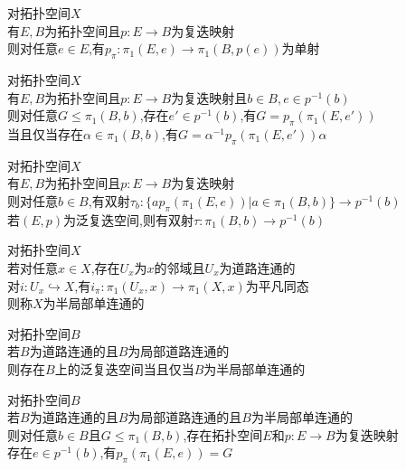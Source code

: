 \begin{dingli}
对拓扑空间$X$\\
有$E,B$为拓扑空间且$p:E\to B$为复迭映射\\
则对任意$e\in E$,有$p_{\pi}:\pi_1(E,e)\to\pi_1(B,p(e))$为单射
\end{dingli}

\begin{dingli}
对拓扑空间$X$\\
有$E,B$为拓扑空间且$p:E\to B$为复迭映射且$b\in B,e\in p^{-1}(b)$\\
则对任意$G\leq\pi_1(B,b)$,存在$e'\in p^{-1}(b)$,有$G=p_{\pi}(\pi_1(E,e'))$\\
当且仅当存在$\alpha\in\pi_1(B,b)$,有$G=\alpha^{-1}p_{\pi}(\pi_1(E,e'))\alpha$
\end{dingli}

\begin{dingli}
对拓扑空间$X$\\
有$E,B$为拓扑空间且$p:E\to B$为复迭映射\\
则对任意$b\in B$,有双射$\tau_{b}:\{ap_{\pi}(\pi_1(E,e))|a\in\pi_1(B,b)\}\to p^{-1}(b)$\\
若$(E,p)$为泛复迭空间,则有双射$\tau:\pi_1(B,b)\to p^{-1}(b)$
\end{dingli}

\begin{dingyi}
对拓扑空间$X$\\
若对任意$x\in X$,存在$U_{x}$为$x$的邻域且$U_{x}$为道路连通的\\
对$i:U_{x}\hookrightarrow X$,有$i_{\pi}:\pi_1(U_{x},x)\to \pi_1(X,x)$为平凡同态\\
则称$X$为半局部单连通的
\end{dingyi}

\begin{dingli}
对拓扑空间$B$\\
若$B$为道路连通的且$B$为局部道路连通的\\
则存在$B$上的泛复迭空间当且仅当$B$为半局部单连通的
\end{dingli}

\begin{dingli}
对拓扑空间$B$\\
若$B$为道路连通的且$B$为局部道路连通的且$B$为半局部单连通的\\
则对任意$b\in B$且$G\leq \pi_1(B,b)$,存在拓扑空间$E$和$p:E\to B$为复迭映射\\
存在$e\in p^{-1}(b)$,有$p_{\pi}(\pi_1(E,e))=G$
\end{dingli}


